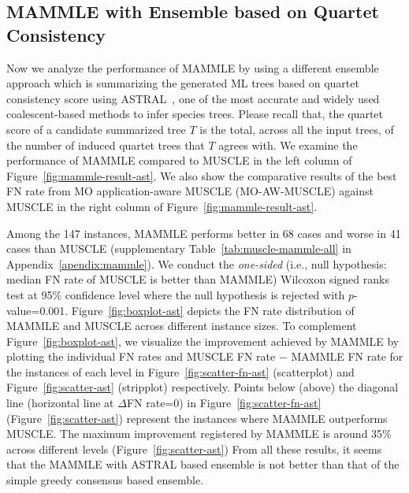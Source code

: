 \subsection{MAMMLE with Ensemble based on Quartet Consistency}
Now we analyze the performance of MAMMLE by using a different ensemble approach which is summarizing the generated ML trees based on quartet consistency score using ASTRAL~\cite{zhang2018astral}, one of the most accurate and widely used coalescent-based methods to infer species trees. Please recall that, the quartet score of a candidate summarized tree $T$ is the total, across all the input trees, of the number of induced quartet trees that $T$ agrees with. We examine the performance of MAMMLE compared to MUSCLE in the left column of Figure~\ref{fig:mammle-result-ast}. We also show the comparative results of the best FN rate from MO application-aware MUSCLE (MO-AW-MUSCLE) against MUSCLE in the right column of Figure~\ref{fig:mammle-result-ast}.

Among the 147 instances, MAMMLE performs better in 68 cases and worse in 41 cases than MUSCLE (supplementary Table~\ref{tab:muscle-mammle-all} in Appendix~\ref{apendix:mammle}). We conduct the \textit{one-sided} (i.e., null hypothesis: median FN rate of MUSCLE is better than MAMMLE) Wilcoxon signed ranks test at 95\% confidence level where the null hypothesis is rejected with $p$-value=0.001. 
Figure~\ref{fig:boxplot-ast} depicts the FN rate distribution of MAMMLE and MUSCLE across different instance sizes. 
To complement Figure~\ref{fig:boxplot-ast}, we visualize the improvement achieved by MAMMLE by plotting the individual FN rates and MUSCLE FN rate $-$ MAMMLE FN rate for the instances of each level in Figure~\ref{fig:scatter-fn-ast} (scatterplot) and Figure~\ref{fig:scatter-ast} (stripplot) respectively. Points below (above) the diagonal line (horizontal line at $\Delta$FN rate=0) in Figure~\ref{fig:scatter-fn-ast} (Figure~\ref{fig:scatter-ast}) represent the instances where MAMMLE outperforms MUSCLE. The maximum improvement registered by MAMMLE is around 35\% across different levels (Figure~\ref{fig:scatter-ast})
From all these results, it seems that the MAMMLE with ASTRAL based ensemble is not better than that of the simple greedy consensus based ensemble. 

